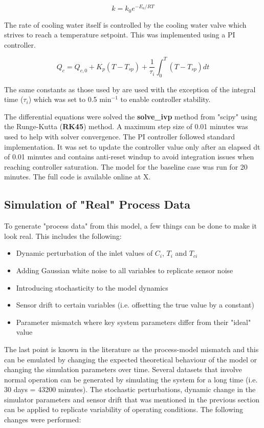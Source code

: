 \documentclass{article}
\begin{document}
\begin{equation}
	k = k_0 e^{-E_a/RT}
\end{equation}

The rate of cooling water itself is controlled by the cooling water valve which strives to reach a temperature setpoint. This was implemented using a PI controller. 

\begin{equation}
	Q_c = Q_{c, 0} + K_p(T-T_{sp}) + \frac{1}{\tau_i}\int_{0}^{T}(T-T_{sp})dt 
\end{equation}

The same constants as those used by \cite{pilario2018canonical} are used with the exception of the integral time ($\tau_i$) which was set to 0.5 min$^{-1}$ to enable controller stability. 

The differential equations were solved the \textbf{solve\_ivp} method from "scipy" using the Runge-Kutta (\textbf{RK45}) method. A maximum step size of 0.01 minutes was used to help with solver convergence. The PI controller followed standard implementation. It was set to update the controller value only after an elapsed dt of 0.01 minutes and contains anti-reset windup to avoid integration issues when reaching controller saturation. The model for the baseline case was run for 20 minutes. The full code is available online at X.

\subsection{Simulation of "Real" Process Data}

To generate "process data" from this model, a few things can be done to make it look real. This includes the following:

\begin{itemize}
	\item Dynamic perturbation of the inlet values of $C_i$, $T_i$ and $T_{ci}$
	\item Adding Gaussian white noise to all variables to replicate sensor noise
	\item Introducing stochasticity to the model dynamics
	\item Sensor drift to certain variables (i.e. offsetting the true value by a constant)
	\item Parameter mismatch where key system parameters differ from their "ideal" value
\end{itemize}

The last point is known in the literature as the process-model mismatch and this can be emulated by changing the expected theoretical behaviour of the model or changing the simulation parameters over time.  Several datasets that involve normal operation can be generated by simulating the system for a long time (i.e. 30 days = 43200 minutes). The stochastic perturbations, dynamic change in the simulator parameters and sensor drift that was mentioned in the previous section can be applied to replicate variability of operating conditions. The following changes were performed:
\end{document}
